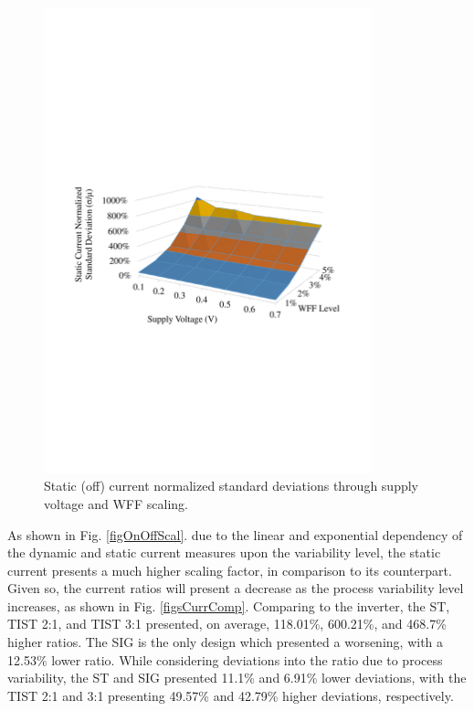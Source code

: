 \documentclass[pgmicro,diss,english]{iiufrgs}
\begin{document}
    \begin{figure}[H]
        \centering
            \includegraphics[width=0.85\textwidth, trim={1.25cm 9cm 2cm 11cm}, clip]{staticCurrDev.pdf}
            \caption{Static (off) current normalized standard deviations through supply voltage and WFF scaling.}
        \label{fig:StatCurrDev}
    \end{figure}



As shown in Fig. \ref{figOnOffScal}. due to the linear and exponential dependency of the dynamic and static current measures upon the variability level, the static current presents a much higher scaling factor, in comparison to its counterpart. Given so, the current ratios will present a decrease as the process variability level increases, as shown in Fig. \ref{figsCurrComp}. Comparing to the inverter, the ST, TIST 2:1, and TIST 3:1 presented, on average, 118.01\%, 600.21\%, and 468.7\% higher ratios. The SIG is the only design which presented a worsening, with a 12.53\% lower ratio. While considering deviations into the ratio due to process variability, the ST and SIG presented 11.1\% and 6.91\% lower deviations, with the TIST 2:1 and 3:1 presenting 49.57\% and 42.79\% higher deviations, respectively.
\end{document}
